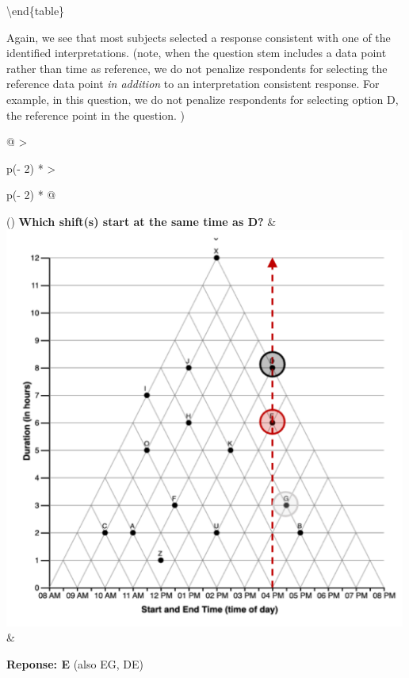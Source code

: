 \documentclass[
  letterpaper,
  DIV=11,
  numbers=noendperiod]{scrreprt}
\begin{document}
\textbackslash end\{table\}

Again, we see that most subjects selected a response consistent with one
of the identified interpretations. (note, when the question stem
includes a data point rather than time as reference, we do not penalize
respondents for selecting the reference data point \emph{in addition} to
an interpretation consistent response. For example, in this question, we
do not penalize respondents for selecting option D, the reference point
in the question. )

\begin{longtable}[]{@{}
  >{\raggedright\arraybackslash}p{(\columnwidth - 2\tabcolsep) * }
  >{\raggedright\arraybackslash}p{(\columnwidth - 2\tabcolsep) * }@{}}
\toprule()
\endhead
\textbf{Which shift(s) start at the same time as D?} & \\
\includegraphics[width=5.20833in,height=\textheight]{analysis/SGC3A/static/interpretations/Q2_111_ORTH.png}
& \begin{minipage}[t]{\linewidth}\raggedright
\textbf{Reponse: E} (also EG, DE)


\end{minipage}
\end{longtable}
\end{document}
